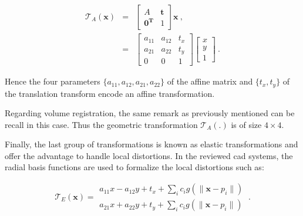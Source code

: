 \begin{eqnarray}
	\mathcal{T}_A(\mathbf{x}) & = & \begin{bmatrix}
		A & \mathbf{t} \\
		\mathbf{0^T} & 1
	\end{bmatrix} \mathbf{x} \ , \nonumber \\
	& = & \begin{bmatrix}
		a_{11} & a_{12} & t_x \\
		a_{21} & a_{22} & t_y \\
		0 & 0 & 1
	\end{bmatrix}\begin{bmatrix}
		x \\
		y \\
		1
	\end{bmatrix} \ . \label{eq:afftra}%
\end{eqnarray}

%
%

Hence the four parameters $\{a_{11},a_{12},a_{21},a_{22}\}$ of the affine matrix and $\{ t_x, t_y \}$ of the translation transform encode an affine transformation.

Regarding volume registration, the same remark as previously mentioned can be recall in this case. Thus the geometric transformation $\mathcal{T}_A(.)$ is of size $4 \times 4$.

Finally, the last group of transformations is known as elastic transformations and offer the advantage to handle local distortions. In the reviewed \ac{cad} systems, the radial basis functions are used to formalize the local distortions such as:

\begin{equation}
	\mathcal{T}_E(\mathbf{x}) = \begin{matrix}
	a_{11} x - a_{12} y + t_x + \sum_i c_i g(\| \mathbf{x} - p_i \|) \\
	a_{21} x + a_{22} y + t_y + \sum_i c_i g(\| \mathbf{x} - p_i \|)
	\end{matrix} \ .
\end{equation}

